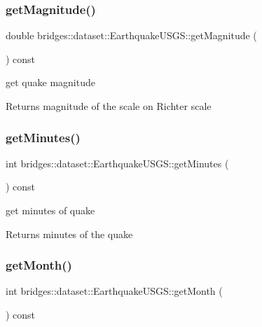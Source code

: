 \subsubsection{\texorpdfstring{get\+Magnitude()}{getMagnitude()}}
{\footnotesize\ttfamily double bridges\+::dataset\+::\+Earthquake\+U\+S\+G\+S\+::get\+Magnitude (\begin{DoxyParamCaption}{ }\end{DoxyParamCaption}) const\hspace{0.3cm}{\ttfamily [inline]}}



get quake magnitude 

\begin{DoxyReturn}{Returns}
magnitude of the scale on Richter scale 
\end{DoxyReturn}
\mbox{\label{classbridges_1_1dataset_1_1_earthquake_u_s_g_s_a2ca08fed1bfc867277dbd99cf25fa3ec}} 
\subsubsection{\texorpdfstring{get\+Minutes()}{getMinutes()}}
{\footnotesize\ttfamily int bridges\+::dataset\+::\+Earthquake\+U\+S\+G\+S\+::get\+Minutes (\begin{DoxyParamCaption}{ }\end{DoxyParamCaption}) const\hspace{0.3cm}{\ttfamily [inline]}}



get minutes of quake 

\begin{DoxyReturn}{Returns}
minutes of the quake 
\end{DoxyReturn}
\mbox{\label{classbridges_1_1dataset_1_1_earthquake_u_s_g_s_a010247e7474cc2434fff823a1a8b1142}} 
\subsubsection{\texorpdfstring{get\+Month()}{getMonth()}}
{\footnotesize\ttfamily int bridges\+::dataset\+::\+Earthquake\+U\+S\+G\+S\+::get\+Month (\begin{DoxyParamCaption}{ }\end{DoxyParamCaption}) const\hspace{0.3cm}{\ttfamily [inline]}}



